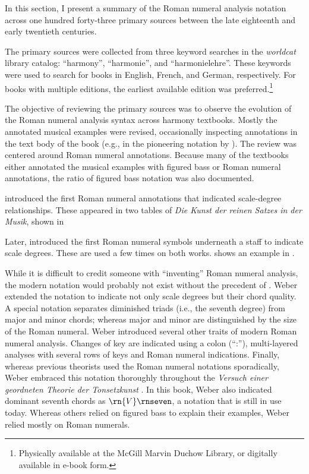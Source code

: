 In this section, I present a summary of the Roman numeral
analysis notation across one hundred forty-three primary
sources between the late eighteenth and early twentieth
centuries.

The primary sources were collected from three keyword
searches in the \emph{worldcat} library catalog:
``harmony'', ``harmonie'', and ``harmonielehre''. These
keywords were used to search for books in English, French,
and German, respectively. For books with multiple editions,
the earliest available edition was
preferred.\footnote{Physically available at the McGill
Marvin Duchow Library, or digitally available in e-book
form.}

The objective of reviewing the primary sources was to
observe the evolution of the Roman numeral analysis syntax
across harmony textbooks. Mostly the annotated musical
examples were revised, occasionally inspecting annotations
in the text body of the book (e.g., in the pioneering
notation by \textcite{kirnberger1774kunst}). The review was
centered around Roman numeral annotations. Because many of
the textbooks either annotated the musical examples with
figured bass or Roman numeral annotations, the ratio of
figured bass notation was also documented.

\textcite{kirnberger1774kunst} introduced the first Roman
numeral annotations that indicated scale-degree
relationships. These appeared in two tables of \emph{Die
Kunst der reinen Satzes in der Musik}, shown in


Later, \textcite{vogler1778grunde, vogler1802handbuch}
introduced the first Roman numeral symbols underneath a
staff to indicate scale degrees. These are used a few times
on both works. 
shows an example in \textcite{vogler1778grunde}.


While it is difficult to credit someone with ``inventing''
Roman numeral analysis, the modern notation would probably
not exist without the precedent of
\textcite{weber1817versuch}. Weber extended the notation to
indicate not only scale degrees but their chord quality. A
special notation separates diminished triads (i.e., the
seventh degree) from major and minor chords; whereas major
and minor are distinguished by the size of the Roman
numeral. Weber introduced several other traits of modern
Roman numeral analysis. Changes of key are indicated using a
colon (``:''), multi-layered analyses with several rows of
keys and Roman numeral indications. Finally, whereas
previous theorists used the Roman numeral notations
sporadically, Weber embraced this notation thoroughly
throughout the \emph{Versuch einer geordneten Theorie der
Tonsetzkunst} \parencite{weber1817versuch}. In this book,
Weber also indicated dominant seventh chords as
$\rn{V}\rnseven$, a notation that is still in use today.
Whereas others relied on figured bass to explain their
examples, Weber relied mostly on Roman numerals.

